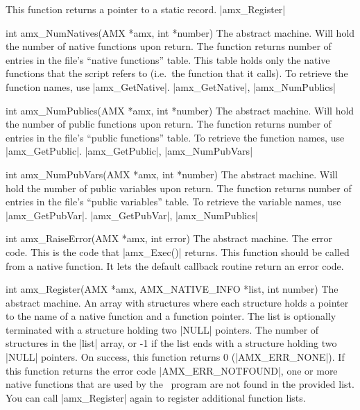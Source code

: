     This function returns a pointer to a static record.
\seealso |amx_Register|

\syntaxp int amx_NumNatives(AMX *amx, int *number)
        The abstract machine.
        Will hold the number of native functions upon return.
\notes
    The function returns number of entries in the file's ``native functions''
    table. This table holds only the native functions that the script refers
    to (i.e.\ the function that it calls). To retrieve the function names, use
    |amx_GetNative|.
\seealso
    |amx_GetNative|, |amx_NumPublics|

\syntaxp int amx_NumPublics(AMX *amx, int *number)
        The abstract machine.
        Will hold the number of public functions upon return.
\notes
    The function returns number of entries in the file's ``public functions''
    table. To retrieve the function names, use |amx_GetPublic|.
\seealso
    |amx_GetPublic|, |amx_NumPubVars|

\syntaxp int amx_NumPubVars(AMX *amx, int *number)
        The abstract machine.
        Will hold the number of public variables upon return.
\notes
    The function returns number of entries in the file's ``public variables''
    table. To retrieve the variable names, use |amx_GetPubVar|.
\seealso
    |amx_GetPubVar|, |amx_NumPublics|

\syntaxp int amx_RaiseError(AMX *amx, int error)
        The abstract machine.
        The error code. This is the code that |amx_Exec()| returns.
\notes
    This function should be called from a native function. It lets the
    default callback routine return an error code.

\syntaxp int amx_Register(AMX *amx, AMX_NATIVE_INFO *list, int number)
        The abstract machine.
        An array with structures where each structure holds a pointer to the
        name of a native function and a function pointer. The list is
        optionally terminated with a structure holding two |NULL| pointers.
        The number of structures in the |list| array, or -1 if the list ends
        with a structure holding two |NULL| pointers.
\notes
    On success, this function returns 0 (|AMX_ERR_NONE|).
    If this function returns the error code |AMX_ERR_NOTFOUND|, one or more
    native functions that are used by the \Small\ program are not found in the
    provided list. You can call |amx_Register| again to register additional
    function lists.


